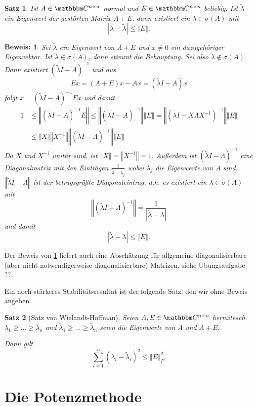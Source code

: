 \documentclass[12pt,a4paper]{book}
\theoremstyle{break}
\newtheorem{theorem}{Satz}[chapter]
\theoremstyle{nonumberplain}
\newtheorem{beweis}{Beweis:}
\newcommand{\C}{\mathbbm C}
\newcommand{\norm}[1]{\left\Vert#1\right\Vert}		%
\newcommand{\1}{\mathbbm{1}} 			      	%
\begin{document}
\begin{theorem}\label{thm:stabEW}
Ist $A\in \C^{n\times n}$ normal und $E\in \C^{n\times n}$ beliebig. Ist $\tilde \lambda$ ein Eigenwert der gestörten Matrix
$A+E$, dann existiert ein $\lambda\in \sigma(A)$ mit
\[
|\lambda-\tilde \lambda| \leq \norm{E}.
\]
\end{theorem}
\begin{beweis}
Sei $\tilde \lambda$ ein Eigenwert von $A+E$ und $x\neq 0$ ein dazugehöriger Eigenvektor.
Ist $\tilde \lambda\in \sigma(A)$, dann stimmt die Behauptung. Sei also $\tilde \lambda\not\in \sigma(A)$. Dann existiert $(\tilde \lambda I-A)^{-1}$ und
aus
\[
Ex=(A+E)x-Ax=(\tilde \lambda I - A)x
\]
folgt $x=(\tilde \lambda I - A)^{-1} Ex$ und damit
\begin{align*}
1 & \leq \norm{(\tilde \lambda I - A)^{-1} E} \leq \norm{(\tilde \lambda I - A)^{-1}} \norm{E}
= \norm{(\tilde \lambda I - X \Lambda X^{-1})^{-1}} \norm{E} \\
&\leq   \norm{X} \norm{X^{-1}} \norm{(\tilde \lambda I - \Lambda )^{-1}} \norm{E}
\end{align*}
Da $X$ und $X^{-1}$ unitär sind, ist $\norm{X}=\norm{X^{-1}}=1$. Außerdem ist 
$(\tilde\lambda I -\Lambda)^{-1}$ eine
Diagonalmatrix mit den Einträgen $\frac{1}{\tilde \lambda- \lambda_j}$ wobei $\lambda_j$ die Eigenwerte von $A$ sind.
$\norm{\tilde \lambda I -\Lambda}$ ist der betragsgrößte Diagonaleintrag, d.h. es existiert ein $\lambda\in \sigma(A)$ mit
\[
\norm{(\tilde \lambda I -\Lambda)^{-1}}=\frac{1}{|\tilde \lambda-\lambda|}
\]
und damit
\[
|\tilde \lambda-\lambda|\leq \norm{E}. 
\]
\phantom{ende}
\end{beweis}

Der Beweis von \ref{thm:stabEW} liefert auch eine Abschätzung für allgemeine diagonalisierbare
(aber nicht notwendigerweise diagonalisierbare) Matrizen, siehe Übungsaufgabe ??.

Ein noch stärkeres Stabilitätsresultat ist der folgende Satz, den wir ohne Beweis angeben.
\begin{theorem}[Satz von Wielandt-Hoffman]
Seien $A,E\in \C^{n\times n}$ hermitesch. $\lambda_1\geq \ldots \geq \lambda_n$ und 
$\tilde \lambda_1\geq \ldots \geq \tilde \lambda_n$ seien die Eigenwerte von $A$ und $A+E$.

Dann gilt
\[
\sum_{i=1}^n (\lambda_i-\tilde \lambda_i)^2 \leq \norm{E}_F^2.
\]
\end{theorem}

\section{Die Potenzmethode}
\end{document}

